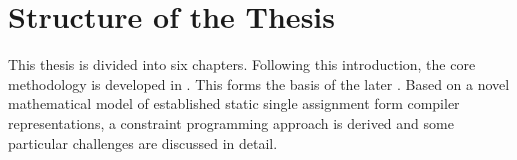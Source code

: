 






\newpage
\section{Structure of the Thesis}

    This thesis is divided into six chapters.
    Following this introduction, the core methodology is developed in
    {\bf{}}.
    This forms the basis of the later
    {\bf{}}.
    Based on a novel mathematical model of established static single assignment
    form compiler representations, a constraint programming approach is derived
    and some particular challenges are discussed in detail.

